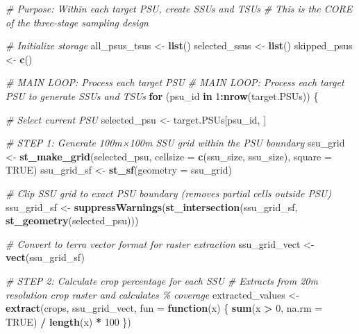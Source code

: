 \documentclass[
  10pt,
  b5paper,
  oneside]{book}
\newenvironment{Shaded}{\begin{snugshade}}{\end{snugshade}}
\newcommand{\AttributeTok}[1]{\textcolor[rgb]{0.13,0.29,0.53}{#1}}
\newcommand{\CommentTok}[1]{\textcolor[rgb]{0.56,0.35,0.01}{\textit{#1}}}
\newcommand{\ConstantTok}[1]{\textcolor[rgb]{0.56,0.35,0.01}{#1}}
\newcommand{\ControlFlowTok}[1]{\textcolor[rgb]{0.13,0.29,0.53}{\textbf{#1}}}
\newcommand{\DecValTok}[1]{\textcolor[rgb]{0.00,0.00,0.81}{#1}}
\newcommand{\FunctionTok}[1]{\textcolor[rgb]{0.13,0.29,0.53}{\textbf{#1}}}
\newcommand{\NormalTok}[1]{#1}
\newcommand{\OtherTok}[1]{\textcolor[rgb]{0.56,0.35,0.01}{#1}}
\newcommand{\SpecialCharTok}[1]{\textcolor[rgb]{0.81,0.36,0.00}{\textbf{#1}}}
\begin{document}
\begin{Shaded}
\begin{Highlighting}[]
\CommentTok{\# Purpose: Within each target PSU, create SSUs and TSUs}
\CommentTok{\# This is the CORE of the three{-}stage sampling design}

\CommentTok{\# Initialize storage}
\NormalTok{all\_psus\_tsus }\OtherTok{\textless{}{-}} \FunctionTok{list}\NormalTok{()}
\NormalTok{selected\_ssus }\OtherTok{\textless{}{-}} \FunctionTok{list}\NormalTok{()}
\NormalTok{skipped\_psus }\OtherTok{\textless{}{-}} \FunctionTok{c}\NormalTok{()}

\CommentTok{\# MAIN LOOP: Process each target PSU}
\CommentTok{\# MAIN LOOP: Process each target PSU to generate SSUs and TSUs}
\ControlFlowTok{for}\NormalTok{ (psu\_id }\ControlFlowTok{in} \DecValTok{1}\SpecialCharTok{:}\FunctionTok{nrow}\NormalTok{(target.PSUs)) \{}
  
  \CommentTok{\# Select current PSU}
\NormalTok{  selected\_psu }\OtherTok{\textless{}{-}}\NormalTok{ target.PSUs[psu\_id, ]}
  
  \CommentTok{\# STEP 1: Generate 100m×100m SSU grid within the PSU boundary}
\NormalTok{  ssu\_grid }\OtherTok{\textless{}{-}} \FunctionTok{st\_make\_grid}\NormalTok{(selected\_psu, }\AttributeTok{cellsize =} \FunctionTok{c}\NormalTok{(ssu\_size, ssu\_size), }\AttributeTok{square =} \ConstantTok{TRUE}\NormalTok{)}
\NormalTok{  ssu\_grid\_sf }\OtherTok{\textless{}{-}} \FunctionTok{st\_sf}\NormalTok{(}\AttributeTok{geometry =}\NormalTok{ ssu\_grid)}
  
  \CommentTok{\# Clip SSU grid to exact PSU boundary (removes partial cells outside PSU)}
\NormalTok{  ssu\_grid\_sf }\OtherTok{\textless{}{-}} \FunctionTok{suppressWarnings}\NormalTok{(}\FunctionTok{st\_intersection}\NormalTok{(ssu\_grid\_sf, }\FunctionTok{st\_geometry}\NormalTok{(selected\_psu)))}
  
  \CommentTok{\# Convert to terra vector format for raster extraction}
\NormalTok{  ssu\_grid\_vect }\OtherTok{\textless{}{-}} \FunctionTok{vect}\NormalTok{(ssu\_grid\_sf)}
  
  \CommentTok{\# STEP 2: Calculate crop percentage for each SSU}
  \CommentTok{\# Extracts from 20m resolution crop raster and calculates \% coverage}
\NormalTok{  extracted\_values }\OtherTok{\textless{}{-}} \FunctionTok{extract}\NormalTok{(crops, ssu\_grid\_vect, }\AttributeTok{fun =} \ControlFlowTok{function}\NormalTok{(x) \{}
    \FunctionTok{sum}\NormalTok{(x }\SpecialCharTok{\textgreater{}} \DecValTok{0}\NormalTok{, }\AttributeTok{na.rm =} \ConstantTok{TRUE}\NormalTok{) }\SpecialCharTok{/} \FunctionTok{length}\NormalTok{(x) }\SpecialCharTok{*} \DecValTok{100}
\NormalTok{  \})}
  

\end{Highlighting}
\end{Shaded}
\end{document}
